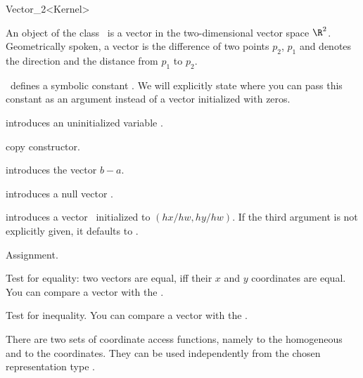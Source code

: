 \begin{ccRefClass} {Vector_2<Kernel>}

\ccDefinition

An object of the class \ccRefName\ is a vector in the two-dimensional 
vector space $\R^2$. Geometrically spoken, a vector is the difference
of two points $p_2$, $p_1$ and denotes the direction and the distance
from   $p_1$ to $p_2$. 

\cgal\ defines a symbolic constant . We 
will explicitly state where you can pass this constant as an argument
instead of a vector initialized with zeros.


\ccCreation
{}


\ccHidden{}
             {introduces an uninitialized variable \ccVar.}

\ccHidden {}
 	    {copy constructor.}

 	    {introduces the vector $b-a$.}

 	    {introduces a null vector \ccVar.}

            {introduces a vector \ccVar\ initialized to $(hx/hw,hy/hw)$.
             If the third argument is not explicitly given, it defaults
             to .
             \ccPrecond {} }


\ccOperations

\ccHidden {}
        {Assignment.}

       {Test for equality: two vectors are equal, iff their $x$ and $y$ 
        coordinates are equal. You can compare a vector with the
        .}

       {Test for inequality. You can compare a vector with the
        .}


There are two sets of coordinate access functions, namely to the
homogeneous and to the  coordinates. They can be used
independently from the chosen representation type .


\end{ccRefClass}
